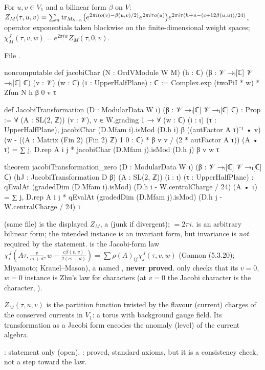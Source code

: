 \begin{definition}\label{l14:def:jacobi}
For $u,v\in V_1$ and a bilinear form $\beta$ on $V$:
$Z_M(\tau,u,v) = \sum_n\operatorname{tr}_{M_{h+n}}\bigl(e^{2\pi i(o(v)-\beta(u,v)/2)}e^{2\pi i\tau o(u)}\bigr)e^{2\pi i\tau(h+n-(c+12\beta(u,u))/24)}$,
operator exponentials taken blockwise on the finite-dimensional weight spaces; $\chi^J_M(\tau,v,w) = e^{2\pi iw}Z_M(\tau,0,v)$.
\end{definition}
\noindent File .
\begin{leancode}
noncomputable def jacobiChar (N : OrdVModule W M) (h : ℂ) (β : 𝒱 →ₗ[ℂ] 𝒱 →ₗ[ℂ] ℂ) (v : 𝒱) (w : ℂ)
    (τ : UpperHalfPlane) : ℂ :=
  Complex.exp (twoPiI * w) * Zfun N h β 0 v τ

def JacobiTransformation (D : ModularData W ι) (β : 𝒱 →ₗ[ℂ] 𝒱 →ₗ[ℂ] ℂ) : Prop :=
  ∀ (A : SL(2, ℤ)) (v : 𝒱), v ∈ W.grading 1 → ∀ (w : ℂ) (i : ι) (τ : UpperHalfPlane),
    jacobiChar (D.Mfam i).isMod (D.h i) β ((autFactor A τ)⁻¹ • v)
        (w - ((A : Matrix (Fin 2) (Fin 2) ℤ) 1 0 : ℂ) * β v v / (2 * autFactor A τ)) (A • τ)
      = ∑ j, D.rep A i j * jacobiChar (D.Mfam j).isMod (D.h j) β v w τ

theorem jacobiTransformation_zero (D : ModularData W ι) (β : 𝒱 →ₗ[ℂ] 𝒱 →ₗ[ℂ] ℂ)
    (hJ : JacobiTransformation D β) (A : SL(2, ℤ)) (i : ι) (τ : UpperHalfPlane) :
    qEvalAt (gradedDim (D.Mfam i).isMod) (D.h i - W.centralCharge / 24) (A • τ)
      = ∑ j, D.rep A i j * qEvalAt (gradedDim (D.Mfam j).isMod) (D.h j - W.centralCharge / 24) τ
\end{leancode}
\begin{dictionary}
 (same file) is the displayed $Z_M$, a  (junk if divergent);  $=2\pi i$.  is an
arbitrary bilinear form; the intended instance is an invariant form, but invariance is \emph{not} required by the statement.
 is the Jacobi-form law $\chi^J_i(A\tau,\frac v{c\tau+d},w-\frac{c\beta(v,v)}{2(c\tau+d)}) =
\sum\rho(A)_{ij}\chi^J_j(\tau,v,w)$ (Gannon (5.3.20); Miyamoto; Krauel--Mason), a named , \textbf{never proved}.
 only checks that its $v=0$, $w=0$ instance is Zhu's law for characters (at $v=0$ the Jacobi
character is the character, ).
\end{dictionary}
\begin{physics}
$Z_M(\tau,u,v)$ is the partition function twisted by the flavour (current) charges of the conserved currents in $V_1$: a
torus with background gauge field. Its transformation as a Jacobi form encodes the anomaly (level) of the current algebra.
\end{physics}
\begin{status}
: statement only (open). : proved, standard axioms, but it is a
consistency check, not a step toward the law.
\end{status}

